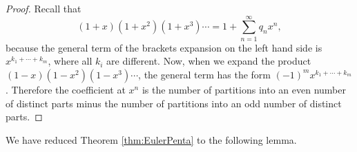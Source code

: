 \begin{proof}
Recall that
\[
(1+x)(1+x^2)(1+x^3) \cdots = 1 + \sum_{n=1}^\infty q_n x^n,
\]
because the general term of the brackets expansion on the left hand side is $x^{k_1 + \cdots + k_m}$, where all $k_i$ are different.
Now, when we expand the product $(1-x)(1-x^2)(1-x^3)\cdots$, the general term has the form $(-1)^m x^{k_1 + \cdots + k_m}$.
Therefore the coefficient at $x^n$ is the number of partitions into an even number of distinct parts
minus the number of partitions into an odd number of distinct parts.
\end{proof}

We have reduced Theorem \ref{thm:EulerPenta} to the following lemma.